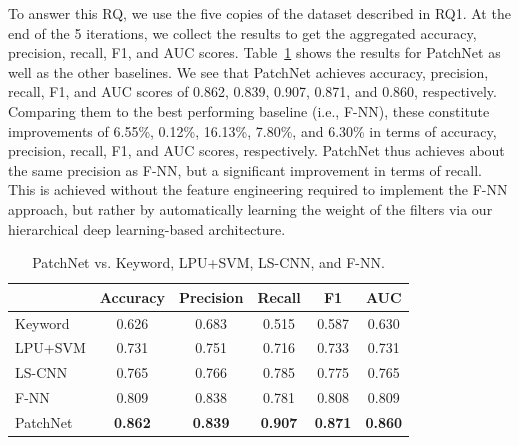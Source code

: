 \vspace{0.1cm}  To
answer this RQ, we use the five copies of the dataset described in RQ1. At
the end of the 5 iterations, we collect the results to get the aggregated
accuracy, precision, recall, F1, and AUC scores.
Table~\ref{tab:msg_code}
shows the results for PatchNet as well as the other baselines. We see that
PatchNet achieves accuracy, precision, recall, F1, and AUC scores of 0.862,
0.839, 0.907, 0.871, and 0.860, respectively. Comparing them to the best
performing baseline (i.e., F-NN), these constitute improvements of
6.55\%, 0.12\%, 16.13\%, 7.80\%, and 6.30\% in terms of accuracy,
precision, recall, F1, and AUC scores, respectively. PatchNet thus achieves
about the same precision as F-NN, but a significant improvement in terms of
recall. This is achieved without the feature engineering required to
implement the F-NN approach, but rather by automatically learning the weight of the filters
via our hierarchical deep learning-based architecture.

\begin{table}[t!]
  \centering
  \caption{PatchNet vs. Keyword, LPU+SVM, LS-CNN, and F-NN.}
    \begin{tabular}{|l|c|c|c|c|c|}
    \hline
          & \textbf{Accuracy} & \textbf{Precision } & \textbf{Recall} & \textbf{F1} & \textbf{AUC} \\
    \hline
    \hline
    Keyword & 0.626 & 0.683 & 0.515 & 0.587 & 0.630 \\
    \hline
    LPU+SVM & 0.731 & 0.751 & 0.716 & 0.733 & 0.731 \\
    \hline
    LS-CNN & 0.765 & 0.766 & 0.785 & 0.775 & 0.765 \\
    \hline
    F-NN & 0.809 & 0.838 & 0.781 & 0.808 & 0.809 \\
    \hline
    PatchNet & \textbf{0.862} & \textbf{0.839} & \textbf{0.907} & \textbf{0.871} & \textbf{0.860} \\
    \hline
    \end{tabular}%
  \label{tab:msg_code}%
\end{table}%


